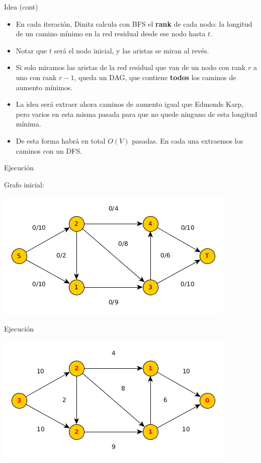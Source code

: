 \documentclass{beamer}
\begin{document}
\begin{frame}{Idea (cont)}
    \begin{itemize}
        \item En cada iteración, Dinitz calcula con BFS el \textbf{rank} de cada nodo: la longitud de un camino mínimo en la red residual desde ese nodo hasta $t$.
        \item Notar que $t$ será el nodo inicial, y las aristas se miran al revés.
        \item Si solo miramos las aristas de la red residual que van de un nodo con rank $r$ a uno con rank $r-1$, queda un DAG, que contiene \textbf{todos} los caminos de aumento mínimos.
        \item La idea será extraer ahora caminos de aumento igual que Edmonds Karp, pero varios en esta misma pasada para que no quede ninguno de esta longitud mínima.
        \item De esta forma habrá en total $O(V)$ pasadas. En cada una extraemos los caminos con un DFS.
    \end{itemize}
\end{frame}

\begin{frame}{Ejecución}

    Grafo inicial:
    
    \includegraphics[scale=0.6]{dinitz/dinitz1.png}
    
\end{frame}

\begin{frame}{Ejecución}

    
    \includegraphics[scale=0.6]{dinitz/dinitz2.png}
    
\end{frame}
\end{document}
